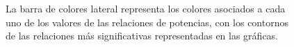 \begin{figure} [h]
{	La barra de colores lateral representa los colores asociados a cada uno de los valores de las relaciones de potencias, con los contornos de las relaciones más significativas representadas en las gráficas.
	}%
	\label{fig:prc_SiCXX}%
\end{figure}